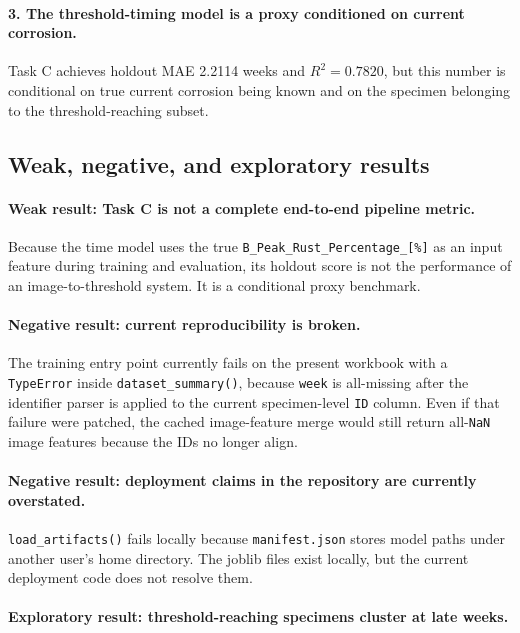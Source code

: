 \documentclass[11pt]{article}
\begin{document}
\paragraph{3. The threshold-timing model is a proxy conditioned on current corrosion.}
Task C achieves holdout MAE 2.2114 weeks and \(R^2=0.7820\), but this number is conditional on true current corrosion being known and on the specimen belonging to the threshold-reaching subset.

\subsection{Weak, negative, and exploratory results}
\paragraph{Weak result: Task C is not a complete end-to-end pipeline metric.}
Because the time model uses the true \texttt{B\_Peak\_Rust\_Percentage\_[\%]} as an input feature during training and evaluation, its holdout score is not the performance of an image-to-threshold system. It is a conditional proxy benchmark.

\paragraph{Negative result: current reproducibility is broken.}
The training entry point currently fails on the present workbook with a \texttt{TypeError} inside \texttt{dataset\_summary()}, because \texttt{week} is all-missing after the identifier parser is applied to the current specimen-level \texttt{ID} column. Even if that failure were patched, the cached image-feature merge would still return all-\texttt{NaN} image features because the IDs no longer align.

\paragraph{Negative result: deployment claims in the repository are currently overstated.}
\texttt{load\_artifacts()} fails locally because \texttt{manifest.json} stores model paths under another user's home directory. The joblib files exist locally, but the current deployment code does not resolve them.

\paragraph{Exploratory result: threshold-reaching specimens cluster at late weeks.}
\end{document}
